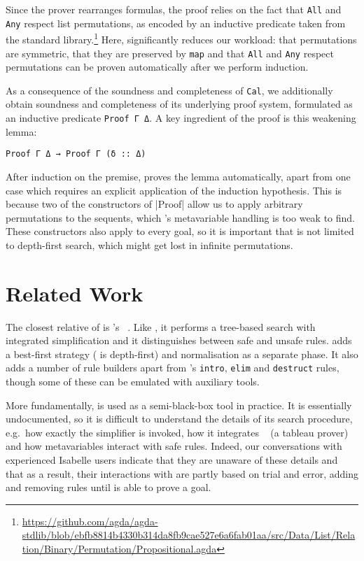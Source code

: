 Since the prover rearranges formulas, the proof relies on the fact that \texttt{All} and \texttt{Any} respect list permutations, as encoded by an inductive predicate taken from the \Agda{} standard library.\footnote{\url{https://github.com/agda/agda-stdlib/blob/ebfb8814b4330b314da8fb9cae527e6a6fab01aa/src/Data/List/Relation/Binary/Permutation/Propositional.agda}}
Here, \Aesop{} significantly reduces our workload: that permutations are symmetric, that they are preserved by \texttt{map} and that \texttt{All} and \texttt{Any} respect permutations can be proven automatically after we perform induction.

As a consequence of the soundness and completeness of \texttt{Cal}, we additionally obtain soundness and completeness of its underlying proof system, formulated as an inductive predicate \texttt{Proof~Γ~Δ}.
A key ingredient of the proof is this weakening lemma:
\begin{lstlisting}
Proof Γ Δ → Proof Γ (δ :: Δ)
\end{lstlisting}
After induction on the premise, \Aesop{} proves the lemma automatically, apart from one case which requires an explicit application of the induction hypothesis.
This is because two of the constructors of |Proof| allow us to apply arbitrary permutations to the sequents, which \Aesop's metavariable handling is too weak to find.
These constructors also apply to every goal, so it is important that \Aesop{} is not limited to depth-first search, which might get lost in infinite permutations.


\section{Related Work}%
\label{sec:related-work}

The closest relative of \Aesop{} is \Isabelle's \auto{}~\cite{Isabelle,IsabelleAuto}.
Like \Aesop, it performs a tree-based search with integrated simplification and it distinguishes between safe and unsafe rules.
\Aesop{} adds a best-first strategy (\auto{} is depth-first) and normalisation as a separate phase.
It also adds a number of rule builders apart from \auto's \texttt{intro}, \texttt{elim} and \texttt{destruct} rules, though some of these can be emulated with auxiliary \Isabelle{} tools.

More fundamentally, \auto{} is used as a semi-black-box tool in practice.
It is essentially undocumented, so it is difficult to understand the details of its search procedure, e.g.\ how exactly the simplifier is invoked, how it integrates \blast~\cite{blast} (a tableau prover) and how metavariables interact with safe rules.
Indeed, our conversations with experienced Isabelle users indicate that they are unaware of these details and that as a result, their interactions with \auto{} are partly based on trial and error, adding and removing rules until \auto{} is able to prove a goal.

